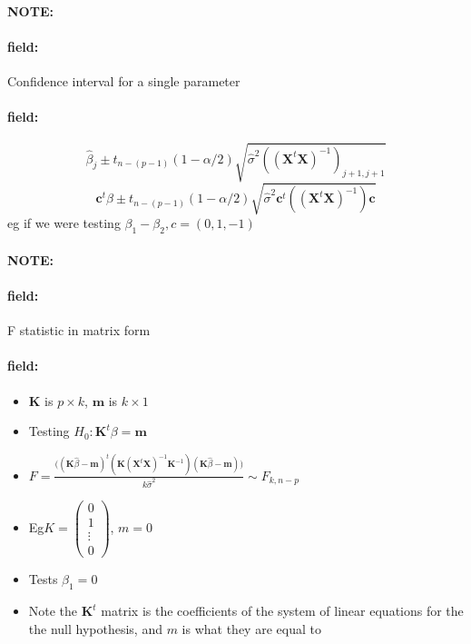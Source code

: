\documentclass[12pt]{article}
\newenvironment{note}{\paragraph{NOTE:}}{}
\newenvironment{field}{\paragraph{field:}}{}
\begin{document}
\begin{note}
  \begin{field}
    Confidence interval for a single parameter
  \end{field}
  \begin{field}
    $$ \hat{\beta}_j \pm t_{n-(p-1)}(1 - \alpha/2)\sqrt{\hat{\sigma}^2((\mathbf{X}^t \mathbf{X})^{-1})_{j+1,j+1}} $$
    $$ \mathbf{c}^t \beta \pm t_{n-(p-1)}(1 - \alpha/2)\sqrt{\hat{\sigma}^2 \mathbf{c}^t((\mathbf{X}^t \mathbf{X})^{-1})\mathbf{c}}  $$
    eg if we were testing $\beta_1 - \beta_2, c = (0,1,-1)$
  \end{field}
\end{note}





\begin{note}
  \begin{field}
    F statistic in matrix form
  \end{field}
  \begin{field}
  \begin{itemize}
    \item $\mathbf{K}$  is $p\times k$, $\mathbf{m}$ is $k\times 1$
    \item Testing $H_0: \mathbf{K}^t\beta = \mathbf{m}$
    \item $F = \frac{\big((\mathbf{K}\hat{\beta} - \mathbf{m})^t (\mathbf{K}(\mathbf{X}^t \mathbf{X})^{-1}\mathbf{K}^{-1})(\mathbf{K}\hat{\beta} - \mathbf{m})\big)}{k\hat{\sigma}^2} \sim F_{k,n-p}$
    \item Eg$K = \begin{pmatrix}
      0 \\ 1 \\ \vdots \\ 0
    \end{pmatrix}$, $m = 0$
    \item Tests $\beta_1 = 0$
    \item Note the $\mathbf{K}^t$ matrix is the coefficients of the system of linear equations for the the null hypothesis, and $m$ is what they are equal to
  \end{itemize}
  \end{field}
\end{note}
\end{document}
